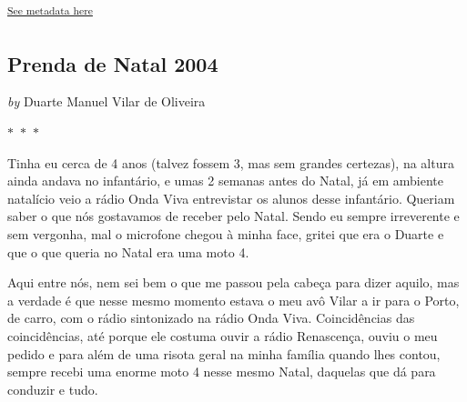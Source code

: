 \documentclass{article}
\begin{document}
        \textsuperscript{\hyperref[table:\arabic{tablecounter}]{See metadata here}}
    


\newpage

\begin{center}
\section{Prenda de Natal 2004}
\vspace{0.5cm}

    
        \textit{by} Duarte Manuel Vilar de Oliveira
    

\vspace{0.75cm}
 
    
\vspace{0.75cm}
    $\ast$~$\ast$~$\ast$  


    \begin{center}
        \begin{minipage}{0.9\textwidth}
            \setlength{\parskip}{0.2cm}
            \setlength{\parindent}{0cm}
            \fontsize{12pt}{14pt}\selectfont
            


Tinha eu cerca de 4 anos (talvez fossem 3, mas sem grandes certezas), na
altura ainda andava no infantário, e umas 2 semanas antes do Natal, já
em ambiente natalício veio a rádio Onda Viva entrevistar os alunos desse
infantário. Queriam saber o que nós gostavamos de receber pelo Natal.
Sendo eu sempre irreverente e sem vergonha, mal o microfone chegou à
minha face, gritei que era o Duarte e que o que queria no Natal era uma
moto 4.

Aqui entre nós, nem sei bem o que me passou pela cabeça para
dizer aquilo, mas a verdade é que nesse mesmo momento estava o meu avô
Vilar a ir para o Porto, de carro, com o rádio sintonizado na rádio Onda
Viva. Coincidências das coincidências, até porque ele costuma ouvir a
rádio Renascença, ouviu o meu pedido e para além de uma risota geral na
minha família quando lhes contou, sempre recebi uma enorme moto 4 nesse
mesmo Natal, daquelas que dá para conduzir e tudo.

        \end{minipage}
    \end{center}
\end{center}
    
\end{document}
